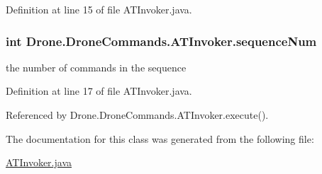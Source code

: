 Definition at line 15 of file A\+T\+Invoker.\+java.

\hypertarget{class_drone_1_1_drone_commands_1_1_a_t_invoker_a3f43a20e12de8cc4f0c652f3c7a3f977}{}
\subsubsection[{sequence\+Num}]{\setlength{\rightskip}{0pt plus 5cm}int Drone.\+Drone\+Commands.\+A\+T\+Invoker.\+sequence\+Num\hspace{0.3cm}{\ttfamily [private]}}\label{class_drone_1_1_drone_commands_1_1_a_t_invoker_a3f43a20e12de8cc4f0c652f3c7a3f977}
the number of commands in the sequence 

Definition at line 17 of file A\+T\+Invoker.\+java.



Referenced by Drone.\+Drone\+Commands.\+A\+T\+Invoker.\+execute().



The documentation for this class was generated from the following file\+:\begin{DoxyCompactItemize}
\item 
\hyperlink{_a_t_invoker_8java}{A\+T\+Invoker.\+java}\end{DoxyCompactItemize}
